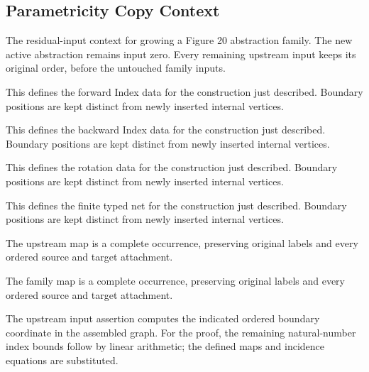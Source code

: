 \subsection{Parametricity Copy Context}
The residual-input context for growing a Figure 20 abstraction family. The new active abstraction remains input zero. Every remaining upstream input keeps its original order, before the untouched family inputs.

This defines the forward Index data for the construction just described. Boundary positions are kept distinct from newly inserted internal vertices.
\par{}

This defines the backward Index data for the construction just described. Boundary positions are kept distinct from newly inserted internal vertices.
\par{}

This defines the rotation data for the construction just described. Boundary positions are kept distinct from newly inserted internal vertices.
\par{}

This defines the finite typed net for the construction just described. Boundary positions are kept distinct from newly inserted internal vertices.
\par{}

The upstream map is a complete occurrence, preserving original labels and every ordered source and target attachment.
\par{}

The family map is a complete occurrence, preserving original labels and every ordered source and target attachment.
\par{}

The upstream input assertion computes the indicated ordered boundary coordinate in the assembled graph.
For the proof, the remaining natural-number index bounds follow by linear arithmetic; the defined maps and incidence equations are substituted.
\par{}

